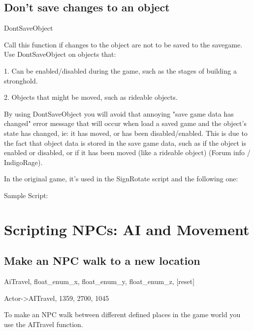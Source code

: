 \documentclass[
]{article}
\begin{document}
\hypertarget{dont-save-changes-to-an-object}{%
\subsection{\texorpdfstring{\hfill\break
Don't save changes to an
object}{ Don't save changes to an object}}\label{dont-save-changes-to-an-object}}

DontSaveObject

Call this function if changes to the object are not to be saved to the
savegame.\\
Use DontSaveObject on objects that:

1. Can be enabled/disabled during the game, such as the stages of
building a stronghold.

2. Objects that might be moved, such as rideable objects.

By using DontSaveObject you will avoid that annoying "save game data has
changed" error message that will occur when load a saved game and the
object's state has changed, ie: it has moved, or has been
disabled/enabled. This is due to the fact that object data is stored in
the save game data, such as if the object is enabled or disabled, or if
it has been moved (like a rideable object) (Forum info / IndigoRage).

In the original game, it's used in the SignRotate script and the
following one:

Sample Script:



\hypertarget{scripting-npcs-ai-and-movement}{%
\section{\texorpdfstring{\hfill\break
Scripting NPCs: AI and
Movement}{ Scripting NPCs: AI and Movement}}\label{scripting-npcs-ai-and-movement}}

\hypertarget{make-an-npc-walk-to-a-new-location}{%
\subsection{Make an NPC walk to a new
location}\label{make-an-npc-walk-to-a-new-location}}

AiTravel, float\_enum\_x, float\_enum\_y, float\_enum\_z, {[}reset{]}

Actor-\textgreater AITravel, 1359, 2700, 1045

To make an NPC walk between different defined places in the game world
you use the AITravel function.
\end{document}
